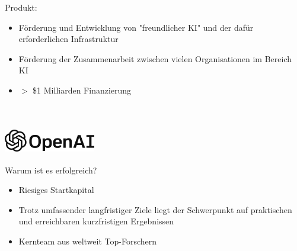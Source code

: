 \documentclass{beamer}
\begin{document}
\begin{frame}
    Produkt: \\
    \begin{itemize}
        \item<1-> Förderung und Entwicklung von "freundlicher KI" und der dafür erforderlichen Infrastruktur
        \item<2-> Förderung der Zusammenarbeit zwischen vielen Organisationen im Bereich KI
        \item<3-> $>$ \$1 Milliarden Finanzierung
    \end{itemize} ~\\
\end{frame}

\begin{frame}
    \frametitle{\includegraphics[width=0.3\textwidth]{openai.png}}
    Warum ist es erfolgreich? \\
    \begin{itemize}
        \item<1-> Riesiges Startkapital
        \item<2-> Trotz umfassender langfristiger Ziele liegt der Schwerpunkt auf praktischen und erreichbaren kurzfristigen Ergebnissen
        \item<3-> Kernteam aus weltweit Top-Forschern
    \end{itemize} ~\\
\end{frame}
\end{document}
